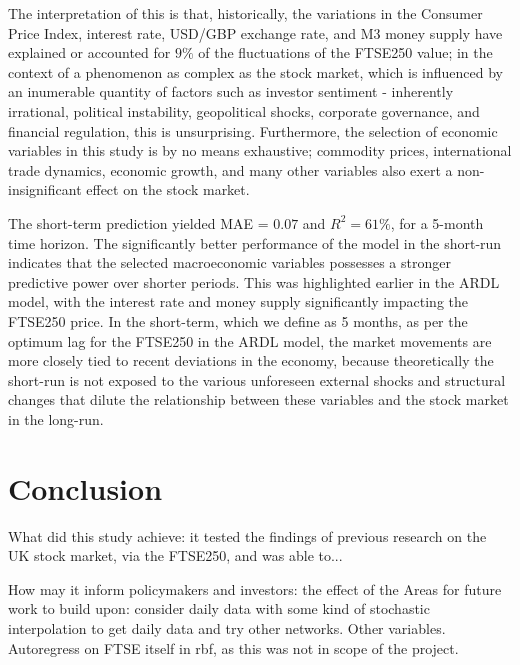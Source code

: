 \documentclass[12pt,a4paper]{article}
\begin{document}
The interpretation of this is that, historically, the variations in the 
Consumer Price Index, interest rate, USD/GBP exchange rate, and M3 money 
supply have explained or accounted for $9\%$ of the fluctuations of the
FTSE250 value; in the context of a phenomenon as complex as the stock market,
which is influenced by an inumerable quantity of factors such as investor sentiment
- inherently irrational, 
political instability, geopolitical shocks, corporate governance, and financial regulation, this is 
unsurprising. Furthermore, the selection of economic variables in this study
is by no means exhaustive; commodity prices, international trade dynamics,
economic growth, and many other variables also exert a non-insignificant 
effect on the stock market.

The short-term prediction yielded MAE = $0.07$ and 
$R^2 = 61\%$, for a 5-month time horizon.
The significantly better performance of the model in the short-run
indicates that the selected macroeconomic variables possesses
a stronger predictive power over shorter periods. This was highlighted 
earlier in the ARDL model, with the interest rate and money supply significantly
impacting the FTSE250 price. In the short-term, which we define as 5 months, 
as per the optimum lag for the FTSE250 in the ARDL model, the market movements
are more closely tied to recent deviations in the economy, because theoretically
the short-run is not exposed to the various unforeseen external shocks and structural changes
that dilute the relationship between these variables and the stock market in the long-run. 


\section{Conclusion}

What did this study achieve: it tested the findings of previous research on the 
UK stock market, via the FTSE250, and was able to...

How may it inform policymakers and investors: the effect of the 
Areas for future work to build upon: consider daily data with some kind of 
stochastic interpolation to get daily data and try other networks. 
Other variables. Autoregress on 
FTSE itself in rbf, as this was not in scope of the project.



\end{document}
